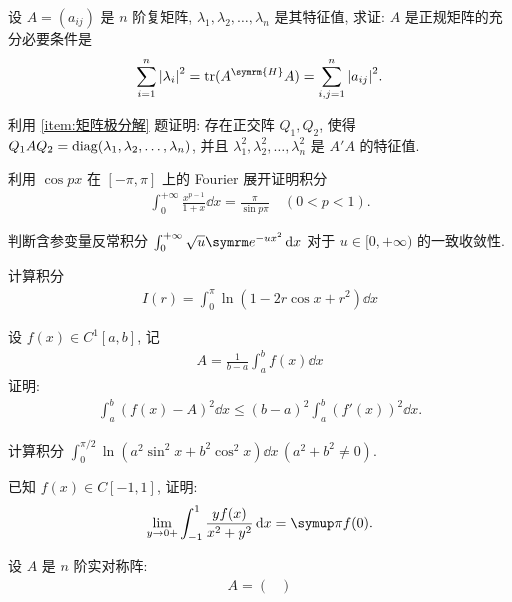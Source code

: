 \documentclass{ctexart}
\begin{document}
    \begin{exercise}[resume=exer]
        \sitem 设 $ A = (a_{ij}) $ 是 $ n $ 阶复矩阵, $ \lambda_{1}, \lambda_{2}, \dots, \lambda_{n} $ 是其特征值, 求证: $ A $ 是正规矩阵的充分必要条件是
        \begin{align*}
            \sum_{i=1}^{n}\abs{\lambda_{i}}^{2} = \tr(A^{\symrm{H}}A) = \sum_{i, j=1}^{n}\abs{a_{ij}}^{2}.
        \end{align*}
        \item 利用 \ref{item:矩阵极分解} 题证明: 存在正交阵 $ Q_{1}, Q_{2} $, 使得 $ Q_{1} A Q_{2} = \operatorname{diag}(\lambda_{1}, \lambda_{2}, \dots, \lambda_{n}) $, 并且 $ \lambda_{1}^{2}, \lambda_{2}^{2}, \dots, \lambda_{n}^{2} $ 是 $ A'A $ 的特征值. 
        \item 利用 $ \cos px $ 在 $ [-\pi, \pi] $ 上的 Fourier 展开证明积分 
        \begin{align*}
            \int_{0}^{+\infty} \frac{x^{p-1}}{1+x} \dd{x} = \frac{\pi}{\sin p\pi}\quad (0<p<1).
        \end{align*}
        \item 判断含参变量反常积分 $ \int_{0}^{+\infty}\sqrt{u}\me^{-ux^{2}} \dd{x} $ 对于 $ u \in [0, +\infty) $ 的一致收敛性. 
        \item 计算积分
        \begin{align*}
            I(r) = \int_{0}^{\pi} \ln(1 - 2r\cos x + r^{2}) \dd{x}
        \end{align*}
        \item 设 $ f(x)\in C^{1}[a, b] $, 记
        \begin{align*}
            A = \frac{1}{b - a}\int_{a}^{b} f(x) \dd{x}
        \end{align*}
        证明:
        \begin{align*}
            \int_{a}^{b}(f(x) - A)^{2} \dd{x} \le (b-a)^{2} \int_{a}^{b} (f'(x))^{2} \dd{x}.
        \end{align*}
        \item 计算积分 $ \int_{0}^{\pi/2} \ln(a^{2}\sin^{2}x + b^{2}\cos^{2} x)\dd{x}\,(a^{2} + b^{2} \ne 0) $.
        \item 已知 $ f(x) \in C[-1, 1] $, 证明:
        \begin{align*}
            \limit{y}{0+} \int_{-1}^{1}\frac{yf(x)}{x^{2} + y^{2}} \dd{x} = \pi f(0).
        \end{align*}
        \item 设 $ A $ 是 $ n $ 阶实对称阵:
        \begin{align*}
            A = \begin{pmatrix}

\end{pmatrix}
\end{align*}
\end{exercise}
\end{document}
